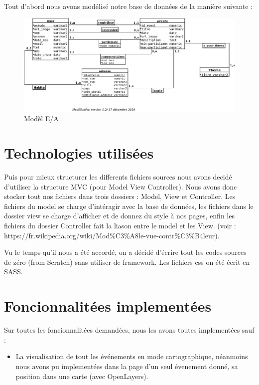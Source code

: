 \documentclass[oneside,11pt,a4paper]{article}
\begin{document}
Tout d'abord nous avons modélisé notre base de données de la manière suivante :

\begin{figure}[h]
  \centering
  \includegraphics[width=1\textwidth]{../../database/modelisation.jpeg}
  \caption{Modèl E/A}
\end{figure}
  
\section{Technologies utilisées}

Puis pour mieux structurer les differents fichiers sources nous avons decidé d'utiliser la structure MVC (pour Model View Controller). Nous avons donc stocker tout nos fichiers dans trois dossiers : Model, View et Controller. Les fichiers du model se charge d'intéragir avec la base de données, les fichiers dans le dossier view se charge d'afficher et de donnez du style à nos pages, enfin les fichiers du dossier Controller fait la liason entre le model et les View. (voir : https://fr.wikipedia.org/wiki/Mod\%C3\%A8le-vue-contr\%C3\%B4leur).


Vu le temps qu'il nous a été accordé, on a décidé d'écrire tout les codes sources de zéro (from Scratch) sans utiliser de framework. 
Les fichiers css on été écrit en SASS.

\section{Foncionnalitées implementées}

Sur toutes les foncionnalitées demandées, nous les avons toutes implementées sauf :

\begin{itemize}
  \item La visualisation de tout les événements en mode cartographique, néanmoins nous avons pu implementées dans la page d'un seul évenement donné, sa position dans une carte (avec OpenLayers).
\end{itemize}
\end{document}
